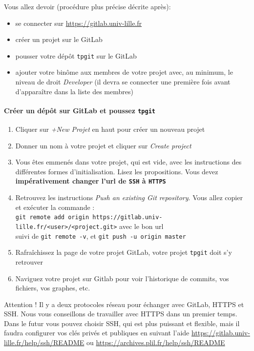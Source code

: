 \documentclass[final, a4paper, openbib, ]{article}
\begin{document}
Vous allez devoir (procédure plus précise décrite après):
\begin{itemize}
\item se connecter sur \url{https://gitlab.univ-lille.fr}
\item créer un projet sur le GitLab
\item pousser votre dépôt \texttt{tpgit} sur le GitLab
\item ajouter votre binôme aux membres de votre projet avec, au minimum, le niveau de droit \textit{Developer} (il devra se connecter une première fois avant d'apparaître dans la liste des membres)
\end{itemize}

\paragraph{Créer un dépôt sur GitLab et poussez \texttt{tpgit}}
\begin{enumerate}
\item Cliquer sur \textit{+New Projet} en haut pour créer un nouveau projet
\item Donner un nom à votre projet et cliquer sur \textit{Create project}
\item Vous êtes emmenés dans votre projet, qui est vide, avec les instructions des différentes formes d'initialisation.
Lisez les propositions.
Vous devez \textbf{impérativement changer l'url de \texttt{SSH} à \texttt{HTTPS}}
\item Retrouvez les instructions \textit{Push an existing Git repository}. Vous allez copier et exécuter la commande :\\ \texttt{git remote add origin https://gitlab.univ-lille.fr/<user>/<project.git>} avec le bon url\\ suivi de \texttt{git remote -v}, et \texttt{git push -u origin master}
\item Rafraîchissez la page de votre projet GitLab, votre projet \texttt{tpgit} doit s'y retrouver
\item Naviguez votre projet sur Gitlab pour voir l'historique de commits, vos fichiers, vos graphes, etc.
\end{enumerate}	

\begin{alertinfo2}{Attention !}
Il y a deux protocoles réseau pour échanger avec GitLab, HTTPS et SSH. Nous vous conseillons de travailler avec HTTPS dans un premier temps.
Dans le futur vous pouvez choisir SSH, qui est plus puissant et flexible, mais il faudra configurer vos clés privés et publiques en suivant l'aide \url{https://gitlab.univ-lille.fr/help/ssh/README} ou \url{https://archives.plil.fr/help/ssh/README}
\end{alertinfo2}
\end{document}
